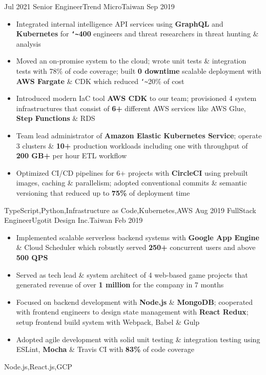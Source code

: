 \begin{experiences}
  \experience
    {Jul 2021}       {Senior Engineer}{Trend Micro}{Taiwan}
    {Sep 2019}      {
                      \begin{itemize}
                        \item{Integrated internal intelligence API services using \textbf{GraphQL} and \textbf{Kubernetes} for \textbf{\texttt{\char`\~}400} engineers and threat researchers in threat hunting \& analysis}
                        \item{Moved an on-promise system to the cloud; wrote unit tests \& integration tests with 78\% of code coverage; built \textbf{0 downtime} scalable deployment with \textbf{AWS Fargate} \& CDK which reduced \texttt{\char`\~}20\% of cost}
                        \item{Introduced modern IaC tool \textbf{AWS CDK} to our team; provisioned 4 system infrastructures that consist of \textbf{6+} different AWS services like AWS Glue, \textbf{Step Functions} \& RDS}
                        \item{Team lead administrator of \textbf{Amazon Elastic Kubernetes Service}; operate 3 clusters \& \textbf{10+} production workloads including one with throughput of \textbf{200 GB+} per hour ETL workflow}
                        \item{Optimized CI/CD pipelines for 6+ projects with \textbf{CircleCI} using prebuilt images, caching \& parallelism; adopted conventional commits \& semantic versioning that reduced up to \textbf{75\%} of deployment time}
                      \end{itemize}
                    }
                    {TypeScript,Python,Infrastructure as Code,Kubernetes,AWS}
  \emptySeparator
  \experience
    {Aug 2019}      {FullStack Engineer}{Ugotit Design Inc.}{Taiwan}
    {Feb 2019}      {
                      \begin{itemize}
                        \item{Implemented scalable serverless backend systems with \textbf{Google App Engine} \& Cloud Scheduler which robustly served \textbf{250+} concurrent users and above \textbf{500 QPS}}
                        \item{Served as tech lead \& system architect of 4 web‐based game projects that generated revenue of over \textbf{1 million} for the company in 7 months}
                        \item{Focused on backend development with \textbf{Node.js} \& \textbf{MongoDB}; cooperated with frontend engineers to design state management with \textbf{React Redux}; setup frontend build system with Webpack, Babel \& Gulp}
                        \item{Adopted agile development with solid unit testing \& integration testing using ESLint, \textbf{Mocha} \& Travis CI with \textbf{83\%} of code coverage}
                      \end{itemize}
                    }
                    {Node.js,React.js,GCP}
\end{experiences}
